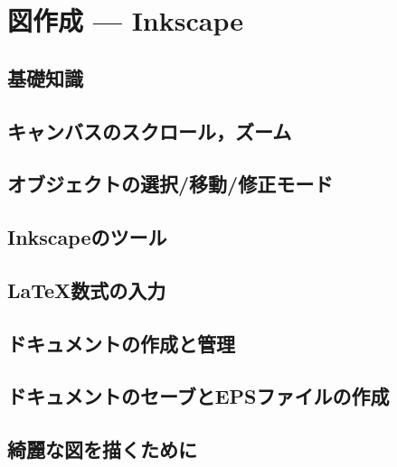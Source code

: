 \documentclass[main]{subfiles}
\begin{document}
\chapter{図作成 --- Inkscape}
\section{基礎知識}
\section{キャンバスのスクロール，ズーム}
\section{オブジェクトの選択/移動/修正モード}
\section{Inkscapeのツール}
\section{\LaTeX 数式の入力}
\section{ドキュメントの作成と管理}
\section{ドキュメントのセーブとEPSファイルの作成}
\section{綺麗な図を描くために}
\end{document}
